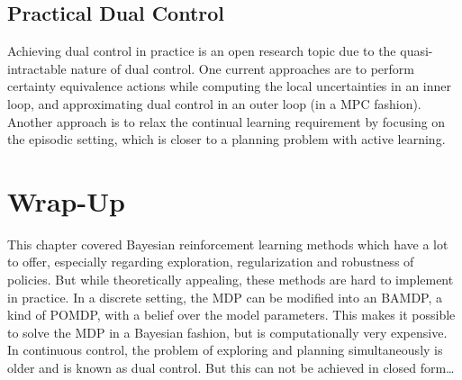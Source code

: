 

		\subsection{Practical Dual Control}
			Achieving dual control in practice is an open research topic due to the quasi-intractable nature of dual control. One current approaches are to perform certainty equivalence actions while computing the local uncertainties in an inner loop, and approximating dual control in an outer loop (in a MPC fashion). Another approach is to relax the continual learning requirement by focusing on the episodic setting, which is closer to a planning problem with active learning.

	\section{Wrap-Up}
		This chapter covered Bayesian reinforcement learning methods which have a lot to offer, especially regarding exploration, regularization and robustness of policies. But while theoretically appealing, these methods are hard to implement in practice. In a discrete setting, the MDP can be modified into an BAMDP, a kind of POMDP, with a belief over the model parameters. This makes it possible to solve the MDP in a Bayesian fashion, but is computationally very expensive. In continuous control, the problem of exploring and planning simultaneously is older and is known as dual control. But this can not be achieved in closed form\dots

